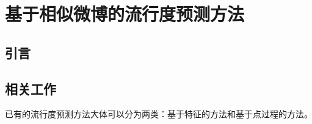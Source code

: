 
\chapter{基于相似微博的流行度预测方法}
\label{chap:three}
\section{引言}




\section{相关工作}
已有的流行度预测方法大体可以分为两类：基于特征的方法和基于点过程的方法。

